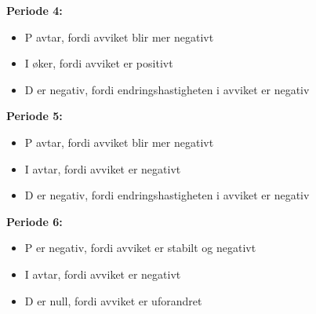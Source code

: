 {\bf Periode 4:}

\begin{itemize}
\item{}P avtar, fordi avviket blir mer negativt
\item{}I øker, fordi avviket er positivt
\item{}D er negativ, fordi endringshastigheten i avviket er negativ
\end{itemize}
\bigskip



{\bf Periode 5:}

\begin{itemize}
\item{}P avtar, fordi avviket blir mer negativt
\item{}I avtar, fordi avviket er negativt
\item{}D er negativ, fordi endringshastigheten i avviket er negativ
\end{itemize}
\bigskip



{\bf Periode 6:}

\begin{itemize}
\item{}P er negativ, fordi avviket er stabilt og negativt
\item{}I avtar, fordi avviket er negativt
\item{}D er null, fordi avviket er uforandret
\end{itemize}




